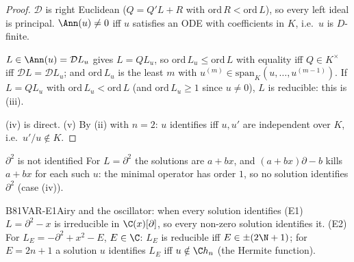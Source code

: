 \begin{proof}
$\mathcal D$ is right Euclidean ($Q=Q'L+R$ with $\mathrm{ord}\,R<\mathrm{ord}\,L$), so every left ideal is principal. $\Ann(u)\ne0$ iff $u$ satisfies an ODE with coefficients in $K$, i.e.\ $u$ is $D$-finite.

$L\in\Ann(u)=\mathcal DL_u$ gives $L=QL_u$, so $\mathrm{ord}\,L_u\le\mathrm{ord}\,L$ with equality iff $Q\in K^\times$ iff $\mathcal DL=\mathcal DL_u$; and $\mathrm{ord}\,L_u$ is the least $m$ with $u^{(m)}\in\mathrm{span}_K(u,\dots,u^{(m-1)})$. If $L=QL_u$ with $\mathrm{ord}\,L_u<\mathrm{ord}\,L$ (and $\mathrm{ord}\,L_u\ge1$ since $u\ne0$), $L$ is reducible: this is (iii).

(iv) is direct. (v) By (ii) with $n=2$: $u$ identifies iff $u,u'$ are independent over $K$, i.e.\ $u'/u\notin K$.

\end{proof}

\begin{example}{$\partial^2$ is not identified}
For $L=\partial^2$ the solutions are $a+bx$, and $(a+bx)\partial-b$ kills $a+bx$ for each such $u$: the minimal operator has order $1$, so no solution identifies $\partial^2$ (case (iv)).
\end{example}

\begin{dimcard}{B81}{VAR-E1}{Airy and the oscillator: when every solution identifies}{\proved}{}
(E1) $L=\partial^2-x$ is irreducible in $\C(x)[\partial]$, so every non-zero solution identifies it. (E2) For $L_E=-\partial^2+x^2-E$, $E\in\C$: $L_E$ is reducible iff $E\in\pm(2\N+1)$; for $E=2n+1$ a solution $u$ identifies $L_E$ iff $u\notin\C h_n$ (the Hermite function).
\end{dimcard}

